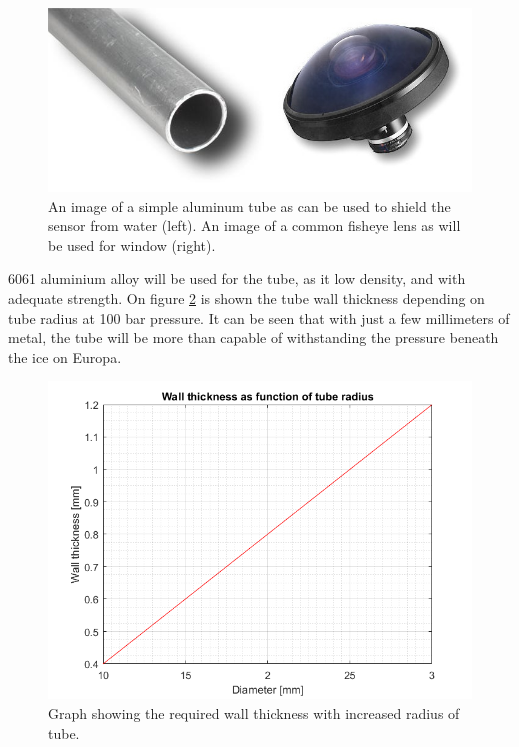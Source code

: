 \begin{figure}[htb]
\begin{center}
\includegraphics[scale=0.6]{figures/RCS/tube_fisheye}
\caption{An image of a simple aluminum tube as can be used to shield the sensor from water (left). An image of a common fisheye lens as will be used for window (right). \cite{Al_tube} \cite{Fisheye}}
\label{fig:tube}
\end{center}
\end{figure}

6061 aluminium alloy will be used for the tube, as it low density, and with adequate strength. On figure \ref{fig:wall_thick} is shown the tube wall thickness depending on tube radius at 100 bar pressure. It can be seen that with just a few millimeters of metal, the tube will be more than capable of withstanding the pressure beneath the ice on Europa.

\begin{figure}[htb]
\begin{center}
\includegraphics[scale=0.8]{figures/RCS/Wall_thickness_graph}
\caption{Graph showing the required wall thickness with increased radius of tube.}
\label{fig:wall_thick}
\end{center}
\end{figure}


